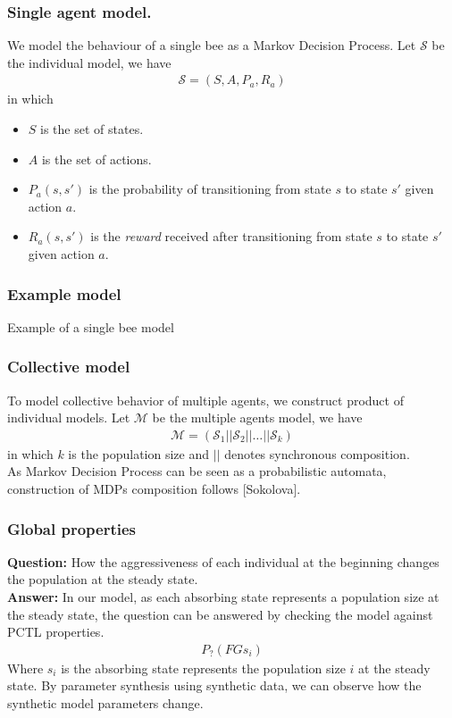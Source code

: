 \documentclass{beamer}
\begin{document}
\begin{frame}
  \frametitle{Single agent model.}
  We model the behaviour of a single bee as a Markov Decision Process. Let
  $\mathcal{S}$ be the individual model, we have
  \begin{align*}
    \mathcal{S} = (S, A, P_a, R_a)
  \end{align*}
  in which
  \begin{itemize}
    \item $S$ is the set of states.
    \item $A$ is the set of actions.
    \item $P_a(s,s')$ is the probability of transitioning from state $s$ to state
          $s'$ given action $a$.
    \item $R_a(s,s')$ is the \textit{reward} received after transitioning from
          state $s$ to state $s'$ given action $a$.
  \end{itemize}
\end{frame}

\begin{frame}
  \frametitle{Example model}
  Example of a single bee model
\end{frame}

\begin{frame}
  \frametitle{Collective model}
  To model collective behavior of multiple agents, we construct product of
  individual models. Let $\mathcal{M}$ be the multiple agents model, we have
  \begin{align*}
    \mathcal{M} = (\mathcal{S}_1||\mathcal{S}_2||\ldots||\mathcal{S}_k)
  \end{align*}
  in which $k$ is the population size and $||$ denotes synchronous composition.\\
  As Markov Decision Process can be seen as a probabilistic automata,
  construction of MDPs composition follows [Sokolova].
\end{frame}

\begin{frame}
  \frametitle{Global properties}
  \textbf{Question:} How the aggressiveness of each individual at the beginning
  changes the population at the steady state.\\
  \textbf{Answer:} In our model, as each absorbing state represents a population
  size at the steady state, the question can be answered by checking the model
  against PCTL properties.
  \begin{align*}
    P_{?} (FG s_i)
  \end{align*}
  Where $s_i$ is the absorbing state represents the population size $i$ at the
  steady state. By parameter synthesis using synthetic data, we can observe how
  the synthetic model parameters change.
\end{frame}
\end{document}
